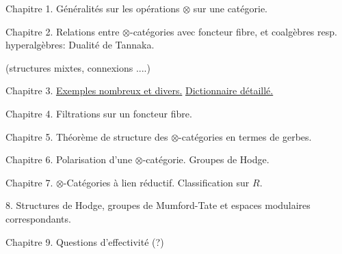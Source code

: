 
Chapitre 1. Généralités sur les opérations $\otimes$ sur une catégorie.


Chapitre 2. Relations entre $\otimes$-catégories  avec foncteur fibre, et coalgèbres resp. hyperalgèbres:  Dualité de Tannaka.

\hfill (structures mixtes, connexions ....)

Chapitre 3. \uline{Exemples nombreux et divers.} \uline{Dictionnaire détaillé.}

Chapitre 4. Filtrations sur un foncteur fibre.

Chapitre 5. Théorème de structure des $\otimes$-catégories en termes de gerbes.

Chapitre 6. Polarisation d'une $\otimes$-catégorie. Groupes de Hodge.

Chapitre 7. $\otimes$-Catégories à lien réductif. Classification sur \uline{$R$}.

 8. Structures de Hodge, groupes de Mumford-Tate et espaces modulaires correspondants.

Chapitre 9. Questions d'effectivité (?)



